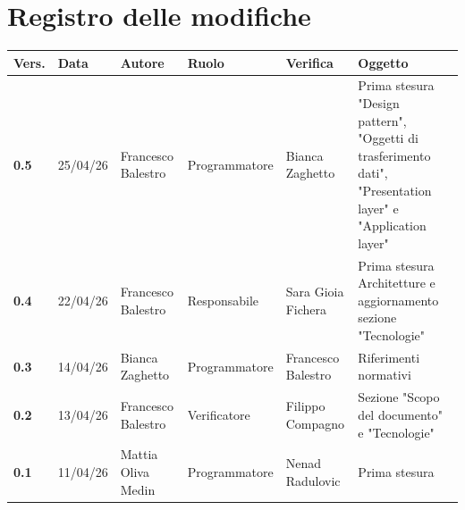 \documentclass[a4paper,12pt]{article}
\begin{document}
    

    \section*{Registro delle modifiche} {
        \begin{table}[h!]
                \begin{tabularx}{\textwidth}{|l|l|l|l|L|L|}
                \hline
                \textbf{Vers.} & \textbf{Data} & \textbf{Autore} & \textbf{Ruolo} & \textbf{Verifica} & \textbf{Oggetto} \\
                \hline
                \textbf{0.5} & 25/04/26 & Francesco Balestro & Programmatore & Bianca Zaghetto & Prima stesura "Design pattern", "Oggetti di trasferimento dati", "Presentation layer" e "Application layer" \\
                \hline
                \textbf{0.4} & 22/04/26 & Francesco Balestro & Responsabile & Sara Gioia Fichera & Prima stesura Architetture e aggiornamento sezione "Tecnologie" \\
                \hline
                \textbf{0.3} & 14/04/26 & Bianca Zaghetto & Programmatore & Francesco Balestro & Riferimenti normativi \\
                \hline
                \textbf{0.2} & 13/04/26 & Francesco Balestro & Verificatore & Filippo Compagno & Sezione "Scopo del documento" e "Tecnologie" \\
                \hline
                \textbf{0.1} & 11/04/26 & Mattia Oliva Medin & Programmatore & Nenad Radulovic & Prima stesura \\
                \hline
            \end{tabularx}
        \end{table}
    }
    \newpage
    
    \tableofcontents
    \newpage

    \listoffigures
    \newpage
    
    \listoftables
    \newpage
\end{document}
